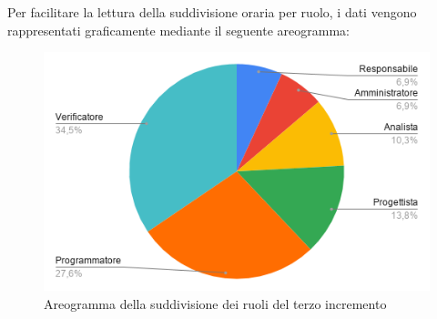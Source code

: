 \documentclass[../piano-di-progetto.tex]{subfiles}
\begin{document}
  Per facilitare la lettura della suddivisione oraria per ruolo, i dati vengono rappresentati graficamente mediante il seguente areogramma:
  \begin{figure}[H]
    \centering
    \includegraphics[width=12cm]{img/ruoli-3-incr.png}
    \caption{Areogramma della suddivisione dei ruoli del terzo incremento}
    \label{fig:ore-ruolo-progettazione}
  \end{figure}
\end{document}
